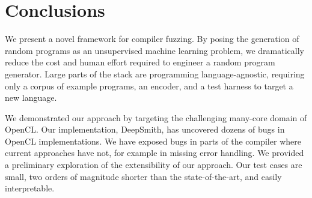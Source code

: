 \section{Conclusions}%
\label{sec:conclusion}

We present a novel framework for compiler fuzzing. By posing the generation of
random programs as an unsupervised machine learning problem, we dramatically
reduce the cost and human effort required to engineer a random program
generator. Large parts of the stack are programming language-agnostic, requiring
only a corpus of example programs, an encoder, and a test harness to target a
new language.

We demonstrated our approach by targeting the challenging many-core domain of
OpenCL. Our implementation, DeepSmith, has uncovered dozens of bugs in OpenCL
implementations. We have exposed bugs in parts of the compiler where current
approaches have not, for example in missing error handling. We provided a
preliminary exploration of the extensibility of our approach. Our test cases are
small, two orders of magnitude shorter than the state-of-the-art, and easily
interpretable.
